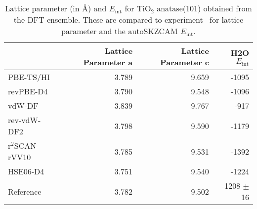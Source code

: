 \begin{table}
\caption{\label{tab:lattice_parametersa-tio2}Lattice parameter (in \AA{}) and  $E_\textrm{int}$ for TiO$_2$ anatase(101) obtained from the DFT ensemble. These are compared to experiment~\cite{burdettStructuralelectronicRelationshipsInorganic1987} for lattice parameter and the autoSKZCAM $E_\textrm{int}$.}
\begin{tabular}{lrrr}
\toprule
 & Lattice Parameter a & Lattice Parameter c & H2O $E_\textrm{int}$ \\ 
\midrule
PBE-TS/HI & 3.789 & 9.659 & -1095 \\
revPBE-D4 & 3.790 & 9.548 & -1096 \\
vdW-DF & 3.839 & 9.767 & -917 \\
rev-vdW-DF2 & 3.798 & 9.590 & -1179 \\
r$^2$SCAN-rVV10 & 3.785 & 9.531 & -1392 \\
HSE06-D4 & 3.751 & 9.540 & -1224 \\
Reference & 3.782 & 9.502 & -1208 $\pm$ 16 \\
\bottomrule
\end{tabular}
\end{table}